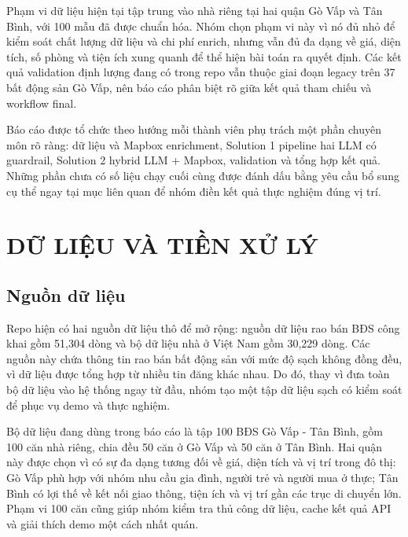 \documentclass[a4paper,12pt]{article}
\begin{document}
Phạm vi dữ liệu hiện tại tập trung vào nhà riêng tại hai quận Gò Vấp và Tân Bình, với 100 mẫu đã được chuẩn hóa. Nhóm chọn phạm vi này vì nó đủ nhỏ để kiểm soát chất lượng dữ liệu và chi phí enrich, nhưng vẫn đủ đa dạng về giá, diện tích, số phòng và tiện ích xung quanh để thể hiện bài toán ra quyết định. Các kết quả validation định lượng đang có trong repo vẫn thuộc giai đoạn legacy trên 37 bất động sản Gò Vấp, nên báo cáo phân biệt rõ giữa kết quả tham chiếu và workflow final.

\begin{tcolorbox}[colback=notebg,colframe=noteframe,title=Phạm vi hoàn thiện theo thành viên]
Báo cáo được tổ chức theo hướng mỗi thành viên phụ trách một phần chuyên môn rõ ràng: dữ liệu và Mapbox enrichment, Solution 1 pipeline hai LLM có guardrail, Solution 2 hybrid LLM + Mapbox, validation và tổng hợp kết quả. Những phần chưa có số liệu chạy cuối cùng được đánh dấu bằng yêu cầu bổ sung cụ thể ngay tại mục liên quan để nhóm điền kết quả thực nghiệm đúng vị trí.
\end{tcolorbox}

\section{DỮ LIỆU VÀ TIỀN XỬ LÝ}

\subsection{Nguồn dữ liệu}
Repo hiện có hai nguồn dữ liệu thô để mở rộng: nguồn dữ liệu rao bán BĐS công khai gồm 51,304 dòng và bộ dữ liệu nhà ở Việt Nam gồm 30,229 dòng. Các nguồn này chứa thông tin rao bán bất động sản với mức độ sạch không đồng đều, vì dữ liệu được tổng hợp từ nhiều tin đăng khác nhau. Do đó, thay vì đưa toàn bộ dữ liệu vào hệ thống ngay từ đầu, nhóm tạo một tập dữ liệu sạch có kiểm soát để phục vụ demo và thực nghiệm.

Bộ dữ liệu đang dùng trong báo cáo là tập 100 BĐS Gò Vấp - Tân Bình, gồm 100 căn nhà riêng, chia đều 50 căn ở Gò Vấp và 50 căn ở Tân Bình. Hai quận này được chọn vì có sự đa dạng tương đối về giá, diện tích và vị trí trong đô thị: Gò Vấp phù hợp với nhóm nhu cầu gia đình, người trẻ và người mua ở thực; Tân Bình có lợi thế về kết nối giao thông, tiện ích và vị trí gần các trục di chuyển lớn. Phạm vi 100 căn cũng giúp nhóm kiểm tra thủ công dữ liệu, cache kết quả API và giải thích demo một cách nhất quán.
\end{document}
